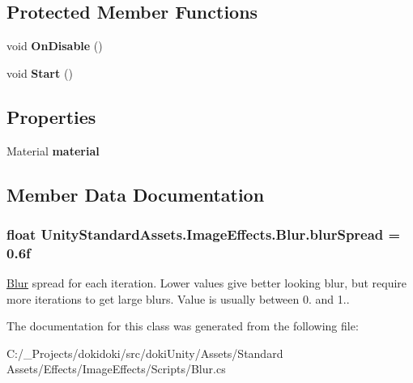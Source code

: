 \subsection*{Protected Member Functions}
\begin{DoxyCompactItemize}
\item 
void {\bfseries On\+Disable} ()\hypertarget{class_unity_standard_assets_1_1_image_effects_1_1_blur_a24ec2c70937612fb12e198f8594ef198}{}\label{class_unity_standard_assets_1_1_image_effects_1_1_blur_a24ec2c70937612fb12e198f8594ef198}

\item 
void {\bfseries Start} ()\hypertarget{class_unity_standard_assets_1_1_image_effects_1_1_blur_a7f252bb396ba1fa98a6daa639d9196dc}{}\label{class_unity_standard_assets_1_1_image_effects_1_1_blur_a7f252bb396ba1fa98a6daa639d9196dc}

\end{DoxyCompactItemize}
\subsection*{Properties}
\begin{DoxyCompactItemize}
\item 
Material {\bfseries material}\hypertarget{class_unity_standard_assets_1_1_image_effects_1_1_blur_aa9a1c99d318055ed40e44b47189e3980}{}\label{class_unity_standard_assets_1_1_image_effects_1_1_blur_aa9a1c99d318055ed40e44b47189e3980}

\end{DoxyCompactItemize}


\subsection{Member Data Documentation}
\subsubsection[{\texorpdfstring{blur\+Spread}{blurSpread}}]{\setlength{\rightskip}{0pt plus 5cm}float Unity\+Standard\+Assets.\+Image\+Effects.\+Blur.\+blur\+Spread = 0.\+6f}\hypertarget{class_unity_standard_assets_1_1_image_effects_1_1_blur_a6e904a33ffd2d23536a1a118566f8aad}{}\label{class_unity_standard_assets_1_1_image_effects_1_1_blur_a6e904a33ffd2d23536a1a118566f8aad}
\hyperlink{class_unity_standard_assets_1_1_image_effects_1_1_blur}{Blur} spread for each iteration. Lower values give better looking blur, but require more iterations to get large blurs. Value is usually between 0. and 1.. 

The documentation for this class was generated from the following file\+:\begin{DoxyCompactItemize}
\item 
C\+:/\+\_\+\+Projects/dokidoki/src/doki\+Unity/\+Assets/\+Standard Assets/\+Effects/\+Image\+Effects/\+Scripts/Blur.\+cs\end{DoxyCompactItemize}
